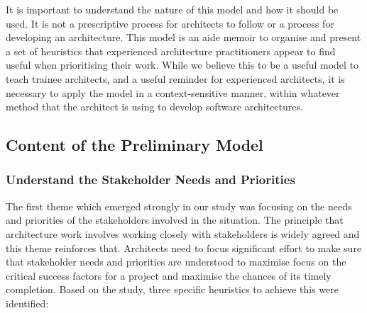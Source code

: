 It is important to understand the nature of this model and how it should be used.  It is not a prescriptive process for architects to follow or a process for developing an architecture.  This model is an aide memoir to organise and present a set of heuristics that experienced architecture practitioners appear to find useful when prioritising their work.  While we believe this to be a useful model to teach trainee architects, and a useful reminder for experienced architects, it is necessary to apply the model in a context-sensitive manner, within whatever method that the architect is using to develop software architectures.

\subsection{Content of the Preliminary Model}
\label{sec:prelim-model-content}

\subsubsection{Understand the Stakeholder Needs and Priorities}

The first theme which emerged strongly in our study was focusing on the needs and priorities of the stakeholders involved in the situation.  The principle that architecture work involves working closely with stakeholders is widely agreed \cite{rozanski2011-ssa2e, bass2012-sainp} and this theme reinforces that. Architects need to focus significant effort to make sure that stakeholder needs and priorities are understood to maximise focus on the critical success factors for a project and maximise the chances of its timely completion.  Based on the study, three specific heuristics to achieve this were identified:

